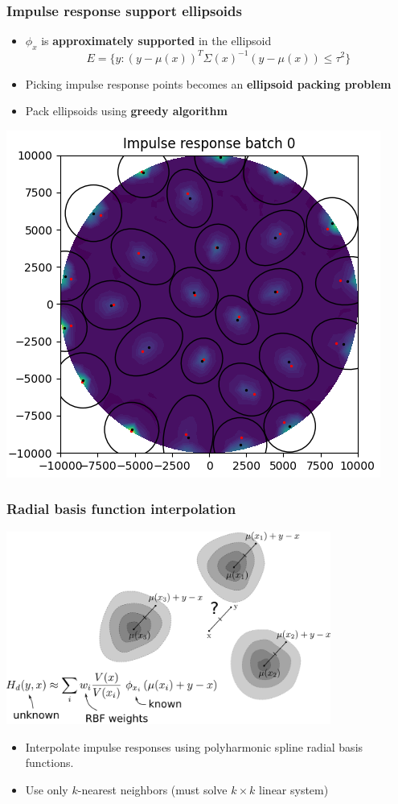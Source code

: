 \documentclass[10pt,final,xcolor=dvipsnames]{beamer}
\begin{document}
\begin{frame}
	\frametitle{Impulse response support ellipsoids}
	\begin{itemize}
	\item $\phi_x$ is \textbf{approximately supported} in the ellipsoid
	$$E = \{y: (y - \mu(x))^T\Sigma(x)^{-1}(y - \mu(x)) \le \tau^2\}$$
	
	\item Picking impulse response points becomes an \textbf{ellipsoid packing problem}
	
	\item Pack ellipsoids using \textbf{greedy algorithm}
	\end{itemize}
	\begin{center}
		\includegraphics[width=0.5\columnwidth]{impulseresponse0.png} 
	\end{center}
\end{frame}


\begin{frame}
	\frametitle{Radial basis function interpolation}
	\begin{center}
		\includegraphics[width=0.8\textwidth]{interpolation_rbf.pdf}
	\end{center}
	\begin{itemize}
		\item Interpolate impulse responses using polyharmonic spline radial basis functions.
		\item Use only $k$-nearest neighbors (must solve $k \times k$ linear system)
	\end{itemize}
\end{frame}
\end{document}
